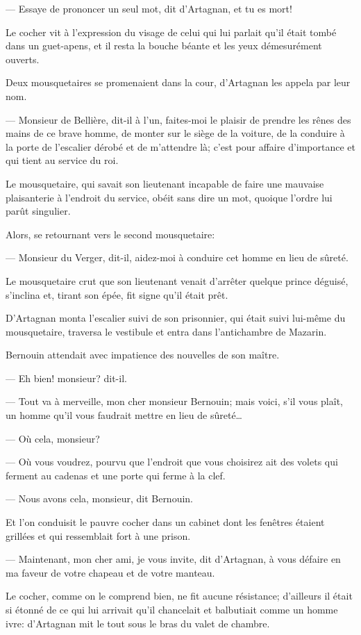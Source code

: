 — Essaye de prononcer un seul mot, dit d'Artagnan, et tu es mort!

Le cocher vit à l'expression du visage de celui qui lui parlait qu'il était tombé dans un guet-apens, et il resta la bouche béante et les yeux démesurément ouverts.

Deux mousquetaires se promenaient dans la cour, d'Artagnan les appela par leur nom.

— Monsieur de Bellière, dit-il à l'un, faites-moi le plaisir de prendre les rênes des mains de ce brave homme, de monter sur le siège de la voiture, de la conduire à la porte de l'escalier dérobé et de m'attendre là; c'est pour affaire d'importance et qui tient au service du roi.

Le mousquetaire, qui savait son lieutenant incapable de faire une mauvaise plaisanterie à l'endroit du service, obéit sans dire un mot, quoique l'ordre lui parût singulier.

Alors, se retournant vers le second mousquetaire:

— Monsieur du Verger, dit-il, aidez-moi à conduire cet homme en lieu de sûreté.

Le mousquetaire crut que son lieutenant venait d'arrêter quelque prince déguisé, s'inclina et, tirant son épée, fit signe qu'il était prêt.

D'Artagnan monta l'escalier suivi de son prisonnier, qui était suivi lui-même du mousquetaire, traversa le vestibule et entra dans l'antichambre de Mazarin.

Bernouin attendait avec impatience des nouvelles de son maître.

— Eh bien! monsieur? dit-il.

— Tout va à merveille, mon cher monsieur Bernouin; mais voici, s'il vous plaît, un homme qu'il vous faudrait mettre en lieu de sûreté\dots

— Où cela, monsieur?

— Où vous voudrez, pourvu que l'endroit que vous choisirez ait des volets qui ferment au cadenas et une porte qui ferme à la clef.

— Nous avons cela, monsieur, dit Bernouin.

Et l'on conduisit le pauvre cocher dans un cabinet dont les fenêtres étaient grillées et qui ressemblait fort à une prison.

— Maintenant, mon cher ami, je vous invite, dit d'Artagnan, à vous défaire en ma faveur de votre chapeau et de votre manteau.

Le cocher, comme on le comprend bien, ne fit aucune résistance; d'ailleurs il était si étonné de ce qui lui arrivait qu'il chancelait et balbutiait comme un homme ivre: d'Artagnan mit le tout sous le bras du valet de chambre.

